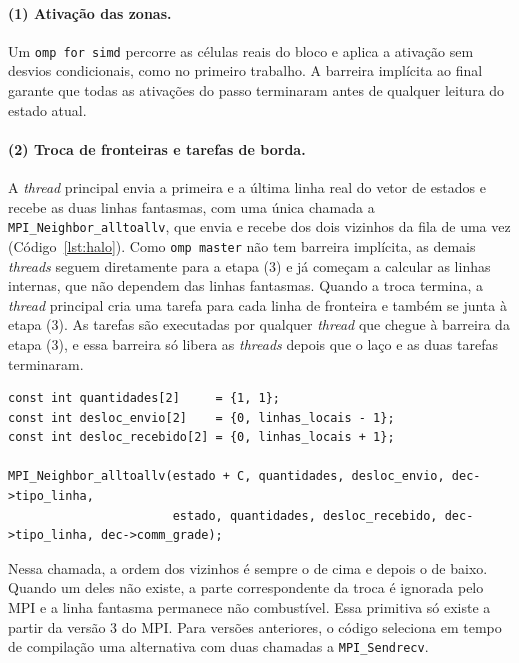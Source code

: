\documentclass[11pt,a4paper]{article}
\begin{document}
\paragraph{(1) Ativação das zonas.} Um \texttt{omp for simd} percorre as células reais do bloco e aplica a ativação sem desvios condicionais, como no primeiro trabalho. A barreira implícita ao final garante que todas as ativações do passo terminaram antes de qualquer leitura do estado atual.

\paragraph{(2) Troca de fronteiras e tarefas de borda.} A \emph{thread} principal envia a primeira e a última linha real do vetor de estados e recebe as duas linhas fantasmas, com uma única chamada a \texttt{MPI\_Neighbor\_alltoallv}, que envia e recebe dos dois vizinhos da fila de uma vez (Código~\ref{lst:halo}). Como \texttt{omp master} não tem barreira implícita, as demais \emph{threads} seguem diretamente para a etapa (3) e já começam a calcular as linhas internas, que não dependem das linhas fantasmas. Quando a troca termina, a \emph{thread} principal cria uma tarefa para cada linha de fronteira e também se junta à etapa (3). As tarefas são executadas por qualquer \emph{thread} que chegue à barreira da etapa (3), e essa barreira só libera as \emph{threads} depois que o laço e as duas tarefas terminaram.

\begin{lstlisting}[caption={Troca das linhas de fronteira com os dois processos vizinhos (posições contadas em linhas).},label={lst:halo}]
const int quantidades[2]     = {1, 1};
const int desloc_envio[2]    = {0, linhas_locais - 1};
const int desloc_recebido[2] = {0, linhas_locais + 1};

MPI_Neighbor_alltoallv(estado + C, quantidades, desloc_envio, dec->tipo_linha,
                       estado, quantidades, desloc_recebido, dec->tipo_linha, dec->comm_grade);
\end{lstlisting}

Nessa chamada, a ordem dos vizinhos é sempre o de cima e depois o de baixo. Quando um deles não existe, a parte correspondente da troca é ignorada pelo MPI e a linha fantasma permanece não combustível. Essa primitiva só existe a partir da versão 3 do MPI. Para versões anteriores, o código seleciona em tempo de compilação uma alternativa com duas chamadas a \texttt{MPI\_Sendrecv}.
\end{document}

